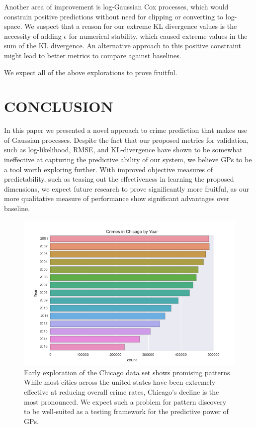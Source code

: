 \documentclass[letterpaper, 11 pt, conference]{ieeeconf}  %
\begin{document}
Another area of improvement is log-Gaussian Cox processes, which would constrain positive predictions without need for clipping or converting to log-space. We suspect that a reason for our extreme KL divergence values is the necessity of adding $\epsilon$ for numerical stability, which caused extreme values in the sum of the KL divergence. An alternative approach to this positive constraint might lead to better metrics to compare against baselines.

We expect all of the above explorations to prove fruitful.
   
\section{CONCLUSION}

In this paper we presented a novel approach to crime prediction that makes use of Gaussian processes. Despite the fact that our proposed metrics for validation, such as log-likelihood, RMSE, and KL-divergence have shown to be somewhat ineffective at capturing the predictive ability of our system, we believe GPs to be a tool worth exploring further. With improved objective measures of predictability, such as teasing out the effectiveness in learning the proposed dimensions, we expect future research to prove significantly more fruitful, as our more qualitative measure of performance show significant advantages over baseline.

\begin{figure}
\centering
\includegraphics[scale=0.4]{chicago_crimes_by_year}
\caption{Early exploration of the Chicago data set shows promising patterns. While most cities across the united states have been extremely effective at reducing overall crime rates, Chicago's decline is the most pronounced. We expect such a problem for pattern discovery to be well-suited as a testing framework for the predictive power of GPs. }
\label{fig:chicago_data}
\end{figure}
\end{document}

